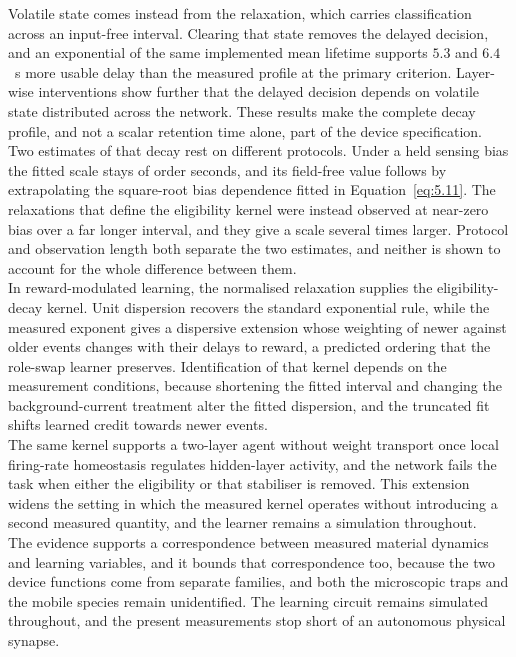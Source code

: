 \noindent Volatile state comes instead from the  relaxation, which carries classification across an
input-free interval. Clearing that state removes the delayed decision, and an exponential of the same implemented mean
lifetime supports $5.3$ and $6.4$~s more usable delay than the measured profile at the primary criterion. Layer-wise
interventions show further that the delayed decision depends on volatile state distributed across the network. These
results make the complete decay profile, and not a scalar retention time alone, part of the device specification.\\

\noindent Two estimates of that decay rest on different protocols. Under a held sensing bias the fitted
scale stays of order seconds, and its field-free value follows by extrapolating the square-root bias dependence
fitted in Equation~\ref{eq:5.11}. The relaxations that define the eligibility kernel were instead observed at
near-zero bias over a far longer interval, and they give a scale several times larger. Protocol and observation length
both separate the two estimates, and neither is shown to account for the whole difference between them.\\

\noindent In reward-modulated learning, the normalised  relaxation supplies the eligibility-decay kernel.
Unit dispersion recovers the standard exponential rule, while the measured exponent gives a dispersive extension whose
weighting of newer against older events changes with their delays to reward, a predicted ordering that the role-swap
learner preserves. Identification of that kernel depends on the measurement conditions, because shortening the fitted
interval and changing the background-current treatment alter the fitted dispersion, and the truncated fit shifts
learned credit towards newer events.\\

\noindent The same kernel supports a two-layer agent without weight transport once local firing-rate homeostasis
regulates hidden-layer activity, and the network fails the task when either the eligibility or that stabiliser is
removed. This extension widens the setting in which the measured kernel operates without introducing a second
measured quantity, and the learner remains a simulation throughout.\\

\noindent The evidence supports a correspondence between measured material dynamics and learning variables, and it
bounds that correspondence too, because the two device functions come from separate families, and both the microscopic
traps and the mobile species remain unidentified.
The learning circuit remains simulated throughout, and the present measurements stop short of an autonomous physical
synapse.

